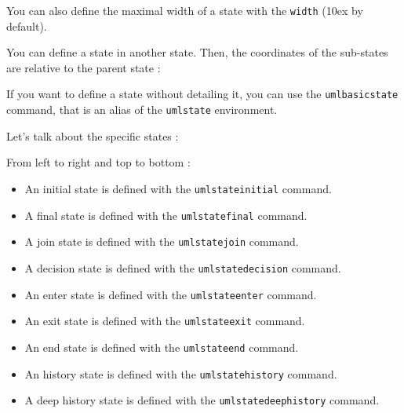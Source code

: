 \documentclass[a4paper,11pt]{report}
\newcommand{\inputTikZ}[1]{%
  }%
\newcommand{\inputTikZ}[1]{%
    \texttt{[image: fig/\#1.pdf]}%
  }%
\begin{document}
\medskip

You can also define the maximal width of a state with the  {\tt width} (10ex by default).

\medskip

You can define a state in another state. Then, the coordinates of the sub-states are relative to the parent state :

\medskip

\begin{minipage}{0.51\textwidth}

\end{minipage}
\begin{minipage}{0.49\textwidth}
\begin{center}
\inputTikZ{stateinner}
\end{center}
\end{minipage}

\medskip

If you want to define a state without detailing it, you can use the {\tt umlbasicstate} command, that is an alias of the {\tt umlstate} environment.

\medskip

Let's talk about the specific states :

\medskip

\begin{minipage}{0.51\textwidth}

\end{minipage}
\begin{minipage}{0.49\textwidth}
\begin{center}
\inputTikZ{statespecial}
\end{center}
\end{minipage}

\medskip

From left to right and top to bottom :

\medskip

\begin{itemize}
\item An initial state is defined with the {\tt umlstateinitial} command.
\item A final state is defined with the {\tt umlstatefinal} command.
\item A join state is defined with the {\tt umlstatejoin} command.
\item A decision state is defined with the {\tt umlstatedecision} command.
\item An enter state is defined with the {\tt umlstateenter} command.
\item An exit state is defined with the {\tt umlstateexit} command.
\item An end state is defined with the {\tt umlstateend} command.
\item An history state is defined with the {\tt umlstatehistory} command.
\item A deep history state is defined with the {\tt umlstatedeephistory} command.
\end{itemize}
\end{document}
